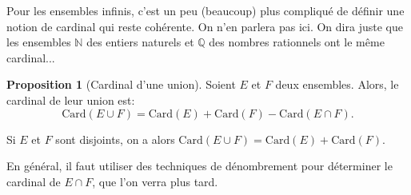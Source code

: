 \documentclass[11pt]{article}
\newcommand{\N}{\mathbb N}
\newcommand{\Q}{\mathbb Q}
\theoremstyle{definition}
\newtheorem{prop}[defn]{Proposition}
\theoremstyle{remark}
\begin{document}
Pour les ensembles infinis, c'est un peu (beaucoup) plus compliqué de définir une notion de cardinal qui reste cohérente. On n'en parlera pas ici. On dira juste que les ensembles $\N$ des entiers naturels et $\Q$ des nombres rationnels ont le même cardinal...

\begin{prop}[Cardinal d'une union]
Soient $E$ et $F$ deux ensembles. Alors, le cardinal de leur union est:
\[
\mathrm{Card}(E\cup F) = \mathrm{Card}(E) + \mathrm{Card}(F) - \mathrm{Card}(E\cap F).
\]

Si $E$ et $F$ sont disjoints, on a alors $\mathrm{Card}(E\cup F)= \mathrm{Card}(E) + \mathrm{Card}(F).$
\end{prop}

En général, il faut utiliser des techniques de dénombrement pour déterminer le cardinal de $E\cap F$, que l'on verra plus tard.

\pagebreak
\tableofcontents
\end{document}
